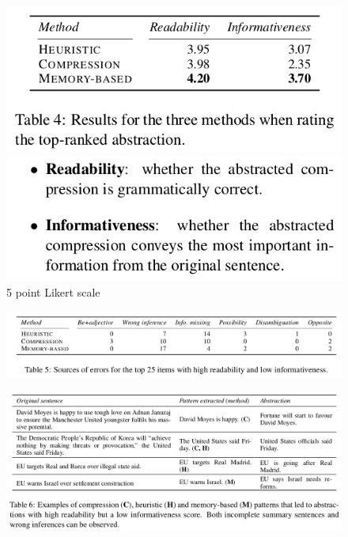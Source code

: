 \documentclass[xcolor={table}]{beamer}
\begin{document}
\begin{frame}{\cite{pighin2014modelling}}
\begin{figure}[h]
\centering
\includegraphics[scale=.3]{images/table4-pighin14} \\
\includegraphics[scale=.3]{images/instr-pighin14} \\
5 point Likert scale 
\end{figure}
\end{frame}

\begin{frame}{\cite{pighin2014modelling}}
\begin{figure}[h]
\centering
\includegraphics[scale=.25]{images/table5-pighin14} \\
\end{figure}
\end{frame}

\begin{frame}{\cite{pighin2014modelling}}
\begin{figure}[h]
\centering
\includegraphics[scale=.25]{images/table6-pighin14} \\
\end{figure}
\end{frame}
\end{document}

